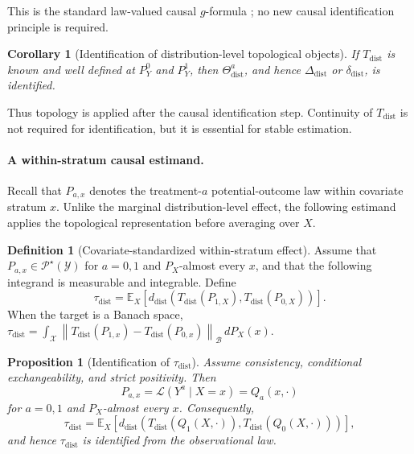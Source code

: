 \documentclass[11pt,a4paper]{article}
\theoremstyle{plain}
\newtheorem{proposition}[theorem]{Proposition}
\newtheorem{corollary}[theorem]{Corollary}
\theoremstyle{definition}
\newtheorem{definition}[theorem]{Definition}
\theoremstyle{remark}
\newcommand{\1}{\mathbbm{1}}
\begin{document}
This is the standard law-valued causal \(g\)-formula
\citep{robins1986,hernanrobins2020}; no new causal identification principle is required.

\begin{corollary}[Identification of distribution-level topological objects]
\label{cor:identification-distribution-tcda}
If \(T_{\mathrm{dist}}\) is known and well defined at \(P_Y^0\) and \(P_Y^1\), then \(\Theta_{\mathrm{dist}}^a\), and hence \(\Delta_{\mathrm{dist}}\) or \(\delta_{\mathrm{dist}}\), is identified.
\end{corollary}

Thus topology is applied after the causal identification step.
Continuity of \(T_{\mathrm{dist}}\) is not required for identification, but it is essential for stable estimation.

\paragraph{A within-stratum causal estimand.}
Recall that \(P_{a,x}\) denotes the treatment-\(a\)
potential-outcome law within covariate stratum \(x\). Unlike the marginal distribution-level effect, the following estimand applies the topological representation before averaging over \(X\).

\begin{definition}[Covariate-standardized within-stratum effect]
\label{def:tau-dist}
Assume that \(P_{a,x}\in\mathcal P^\star(\mathcal Y)\) for
\(a=0,1\) and \(P_X\)-almost every \(x\), and that the following integrand is measurable and integrable. Define
\[
\tau_{\mathrm{dist}}
=
\mathbb E_X\!\left[
d_{\mathrm{dist}}\!\left(
T_{\mathrm{dist}}(P_{1,X}),
T_{\mathrm{dist}}(P_{0,X})
\right)
\right].
\]
When the target is a Banach space,
\(\tau_{\mathrm{dist}} = \int_{\mathcal X}
\left\| T_{\mathrm{dist}}(P_{1,x})
- T_{\mathrm{dist}}(P_{0,x}) \right\|_{\mathcal B}
\,dP_X(x)\).
\end{definition}

\begin{proposition}[Identification of \(\tau_{\mathrm{dist}}\)]
\label{prop:identification-tau-dist}
Assume consistency, conditional exchangeability, and strict positivity. Then
\[
P_{a,x}
=
\mathcal L(Y^a\mid X=x)
=
Q_a(x,\cdot)
\]
for \(a=0,1\) and \(P_X\)-almost every \(x\). Consequently,
\[
\tau_{\mathrm{dist}}
=
\mathbb E_X\!\left[
d_{\mathrm{dist}}\!\left(
T_{\mathrm{dist}}(Q_1(X,\cdot)),
T_{\mathrm{dist}}(Q_0(X,\cdot))
\right)
\right],
\]
and hence \(\tau_{\mathrm{dist}}\) is identified from the observational law.
\end{proposition}
\end{document}
